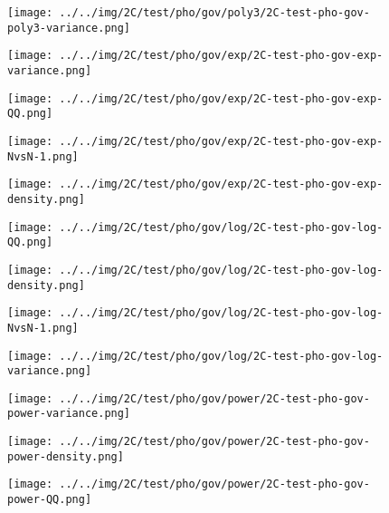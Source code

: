 \begin{figure}[H]
\centering	\texttt{[image: ../../img/2C/test/pho/gov/poly3/2C-test-pho-gov-poly3-variance.png]}
\end{figure}
\begin{figure}[H]
\centering	\texttt{[image: ../../img/2C/test/pho/gov/exp/2C-test-pho-gov-exp-variance.png]}
\end{figure}
\begin{figure}[H]
\centering	\texttt{[image: ../../img/2C/test/pho/gov/exp/2C-test-pho-gov-exp-QQ.png]}
\end{figure}
\begin{figure}[H]
\centering	\texttt{[image: ../../img/2C/test/pho/gov/exp/2C-test-pho-gov-exp-NvsN-1.png]}
\end{figure}
\begin{figure}[H]
\centering	\texttt{[image: ../../img/2C/test/pho/gov/exp/2C-test-pho-gov-exp-density.png]}
\end{figure}
\begin{figure}[H]
\centering	\texttt{[image: ../../img/2C/test/pho/gov/log/2C-test-pho-gov-log-QQ.png]}
\end{figure}
\begin{figure}[H]
\centering	\texttt{[image: ../../img/2C/test/pho/gov/log/2C-test-pho-gov-log-density.png]}
\end{figure}
\begin{figure}[H]
\centering	\texttt{[image: ../../img/2C/test/pho/gov/log/2C-test-pho-gov-log-NvsN-1.png]}
\end{figure}
\begin{figure}[H]
\centering	\texttt{[image: ../../img/2C/test/pho/gov/log/2C-test-pho-gov-log-variance.png]}
\end{figure}
\begin{figure}[H]
\centering	\texttt{[image: ../../img/2C/test/pho/gov/power/2C-test-pho-gov-power-variance.png]}
\end{figure}
\begin{figure}[H]
\centering	\texttt{[image: ../../img/2C/test/pho/gov/power/2C-test-pho-gov-power-density.png]}
\end{figure}
\begin{figure}[H]
\centering	\texttt{[image: ../../img/2C/test/pho/gov/power/2C-test-pho-gov-power-QQ.png]}
\end{figure}

